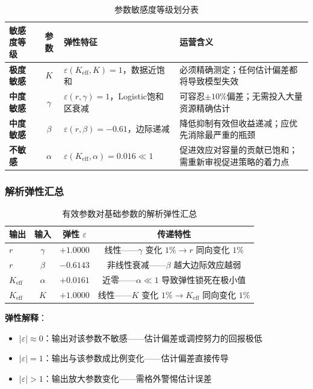 \documentclass[12pt,a4paper]{ctexart}
\begin{document}
\begin{table}[htbp]
\centering
\caption{参数敏感度等级划分表}
\label{tab:sensitivity_rank}
\begin{tabular}{p{2.2cm} c p{4.6cm} p{5.5cm}}
\toprule
敏感度等级 & 参数 & 弹性特征 & 运营含义 \\
\midrule
\textbf{极度敏感} & $K$ & $\varepsilon(K_{\text{eff}}, K)=1$，数据近饱和 & 必须精确测定；任何估计偏差都将导致模型失效 \\
\textbf{中度敏感} & $\gamma$ & $\varepsilon(r, \gamma)=1$，Logistic饱和区衰减 & 可容忍$\pm10\%$偏差；无需投入大量资源精确估计 \\
\textbf{中度敏感} & $\beta$ & $\varepsilon(r, \beta)=-0.61$，边际递减 & 降低抑制有效但收益递减；应优先消除最严重的瓶颈 \\
\textbf{不敏感} & $\alpha$ & $\varepsilon(K_{\text{eff}}, \alpha)=0.016 \ll 1$ & 促进效应对容量的贡献已饱和；需重新审视促进策略的着力点 \\
\bottomrule
\end{tabular}
\end{table}

\subsubsection{解析弹性汇总}

\begin{table}[htbp]
\centering
\caption{有效参数对基础参数的解析弹性汇总}
\label{tab:elasticity_summary}
\begin{tabular}{lccc}
\toprule
输出 & 输入 & 弹性 $\varepsilon$ & 传递特性 \\
\midrule
$r$ & $\gamma$ & $+1.0000$ & 线性——$\gamma$ 变化 $1\% \to r$ 同向变化 $1\%$ \\
$r$ & $\beta$  & $-0.6143$ & 非线性衰减——$\beta$ 越大边际效应越弱 \\
$K_{\text{eff}}$ & $\alpha$ & $+0.0161$ & 近零——$\alpha \ll 1$ 导致弹性锁死在极小值 \\
$K_{\text{eff}}$ & $K$      & $+1.0000$ & 线性——$K$ 变化 $1\% \to K_{\text{eff}}$ 同向变化 $1\%$ \\
\bottomrule
\end{tabular}
\end{table}

\textbf{弹性解释}：
\begin{itemize}
  \item $|\varepsilon| \approx 0$：输出对该参数不敏感——估计偏差或调控努力的回报极低
  \item $|\varepsilon| = 1$：输出与该参数成比例变化——估计偏差直接传导
  \item $|\varepsilon| > 1$：输出放大参数变化——需格外警惕估计误差
\end{itemize}
\end{document}
